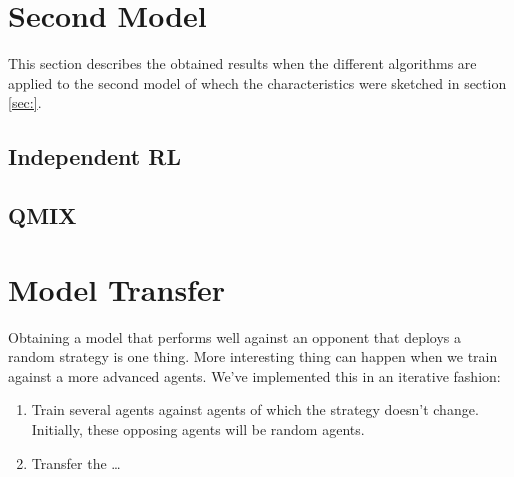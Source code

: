 \section{Second Model}
This section describes the obtained results when the different algorithms are applied to the second model of whech the characteristics were sketched in section \ref{sec:}.
\subsection{Independent RL}
\subsection{QMIX}

\section{Model Transfer}
Obtaining a model that performs well against an opponent that deploys a random strategy is one thing. More interesting thing can happen when we train against a more advanced agents. We've implemented this in an iterative fashion:
\begin{enumerate}
    \item Train several agents against agents of which the strategy doesn't change. Initially, these opposing agents will be random agents.
    \item Transfer the \ldots
\end{enumerate}
